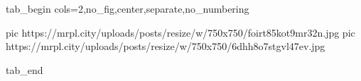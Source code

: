  
 
 
 
 


\ifcmt
  tab_begin cols=2,no_fig,center,separate,no_numbering

     pic https://mrpl.city/uploads/posts/resize/w/750x750/foirt85kot9mr32n.jpg
		 pic https://mrpl.city/uploads/posts/resize/w/750x750/6dhh8o7stgvl47ev.jpg

  tab_end
\fi

